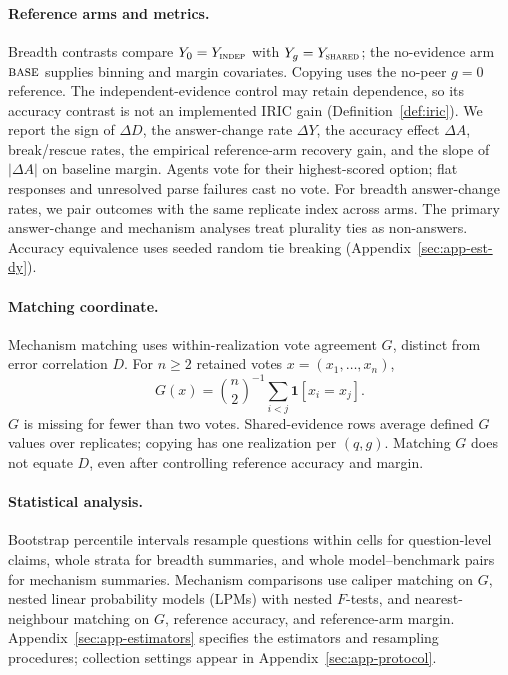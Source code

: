 \documentclass[11pt,a4paper]{article}
\theoremstyle{definition}
\newcommand{\Dep}{D}
\newcommand{\shared}{\textsc{shared}}
\newcommand{\indep}{\textsc{indep}}
\newcommand{\nocond}{\textsc{base}}
\begin{document}
\paragraph{Reference arms and metrics.}
Breadth contrasts compare $Y_0=Y_{\indep}$ with $Y_g=Y_{\shared}$;
the no-evidence arm $\nocond$ supplies binning and margin covariates.
Copying uses the no-peer $g=0$ reference. The independent-evidence control
may retain dependence, so its accuracy contrast is not an implemented IRIC
gain (Definition~\ref{def:iric}). We report the sign of $\Delta\Dep$, the answer-change rate $\Delta Y$,
the accuracy effect $\Delta A$, break/rescue rates, the empirical reference-arm
recovery gain, and the slope of $|\Delta A|$ on baseline margin.
Agents vote for their highest-scored option; flat responses and unresolved
parse failures cast no vote. For breadth answer-change rates, we pair outcomes with the same replicate
index across arms. The primary answer-change and mechanism analyses treat
plurality ties as non-answers. Accuracy equivalence uses seeded random tie breaking
(Appendix~\ref{sec:app-est-dy}).

\paragraph{Matching coordinate.}
Mechanism matching uses within-realization vote agreement $G$, distinct
from error correlation $\Dep$. For $n\ge2$ retained votes
$x=(x_1,\ldots,x_n)$,
\begin{equation}
G(x)=\binom{n}{2}^{-1}\sum_{i<j}\mathbf1[x_i=x_j].
\label{eq:vote-agreement}
\end{equation}
$G$ is missing for fewer than two votes. Shared-evidence rows average
defined $G$ values over replicates; copying has one realization per
$(q,g)$. Matching $G$ does not equate $\Dep$, even after controlling
reference accuracy and margin.

\paragraph{Statistical analysis.}
Bootstrap percentile intervals resample questions within cells for
question-level claims, whole strata for breadth summaries, and whole
model--benchmark pairs for mechanism summaries. Mechanism comparisons use
caliper matching on $G$, nested linear probability models (LPMs) with
nested $F$-tests, and nearest-neighbour matching on $G$, reference accuracy,
and reference-arm margin. Appendix~\ref{sec:app-estimators} specifies the
estimators and resampling procedures; collection settings appear in
Appendix~\ref{sec:app-protocol}.
\end{document}
